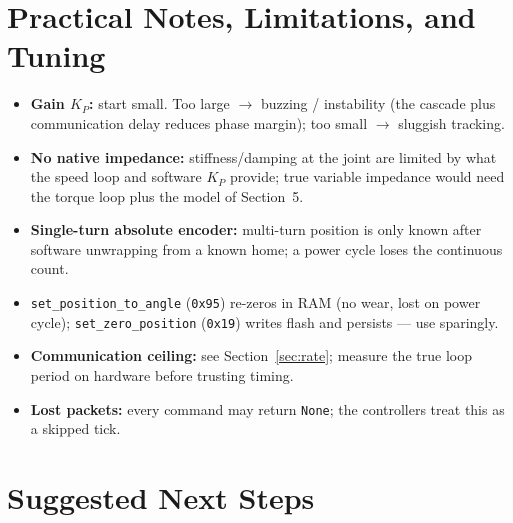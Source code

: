 \documentclass[11pt,a4paper]{article}
\newcommand{\code}[1]{\texttt{#1}}
\begin{document}
\section{Practical Notes, Limitations, and Tuning}

\begin{itemize}[nosep]
  \item \textbf{Gain $K_P$:} start small. Too large $\to$ buzzing / instability
        (the cascade plus communication delay reduces phase margin); too small
        $\to$ sluggish tracking.
  \item \textbf{No native impedance:} stiffness/damping at the joint are limited
        by what the speed loop and software $K_P$ provide; true variable
        impedance would need the torque loop plus the model of
        Section~5.
  \item \textbf{Single-turn absolute encoder:} multi-turn position is only known
        after software unwrapping from a known home; a power cycle loses the
        continuous count.
  \item \texttt{set\_position\_to\_angle} (\texttt{0x95}) re-zeros in RAM (no
        wear, lost on power cycle); \code{set\_zero\_position} (\texttt{0x19})
        writes flash and persists --- use sparingly.
  \item \textbf{Communication ceiling:} see Section~\ref{sec:rate}; measure the
        true loop period on hardware before trusting timing.
  \item \textbf{Lost packets:} every command may return \code{None}; the
        controllers treat this as a skipped tick.
\end{itemize}

\section{Suggested Next Steps}
\end{document}
